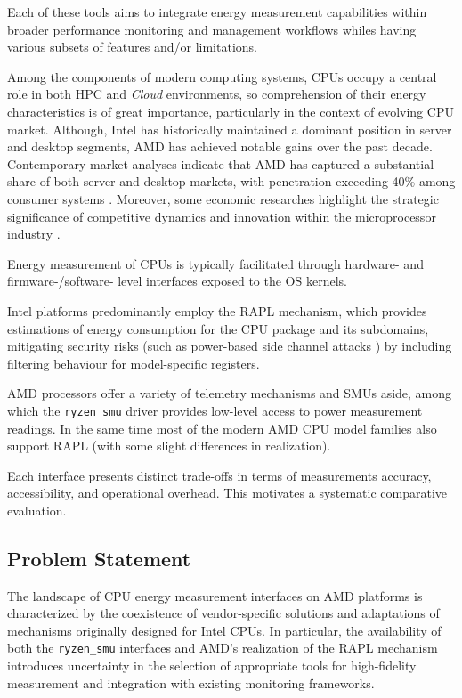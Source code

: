 Each of these tools aims to integrate energy measurement capabilities within
broader performance monitoring and management workflows whiles having various
subsets of features and/or limitations.

Among the components of modern computing systems, \gls{CPU}s occupy a central
role in both \gls{HPC} and \emph{Cloud} environments, so comprehension
of their energy characteristics is of great importance, particularly
in the context of evolving \gls{CPU} market. Although, Intel has historically
maintained a dominant position in server and desktop segments, AMD has
achieved notable gains over the past decade. Contemporary market analyses
indicate that AMD has captured a substantial share of both server and
desktop markets, with penetration exceeding 40\% among consumer systems
\parencite{NetworkWorld2025_Q1ServerShare}. Moreover, some economic researches
highlight the strategic significance of competitive dynamics
and innovation within the microprocessor industry
\parencite{GoettlerGordon2009_Competition}.

Energy measurement of \gls{CPU}s is typically facilitated through hardware- and
firmware-/software- level interfaces exposed to the \gls{OS} kernels.

Intel platforms predominantly employ the \gls{RAPL} mechanism, which provides
estimations of energy consumption for the \gls{CPU} package and its subdomains,
mitigating security risks (such as power-based side channel attacks
\parencite{PwrLeak_2023}) by including filtering behaviour for model-specific
registers.\parencite{IntelRAPL}

AMD processors offer a variety of telemetry mechanisms and \gls{SMU}s aside,
among which the \texttt{ryzen\_smu} \parencite{RyzenSMU_GitHub} driver provides
low-level access to power measurement readings. In the same time most of the
modern AMD \gls{CPU} model families also support \gls{RAPL} (with some slight
differences in realization).

Each interface presents distinct trade-offs in terms of measurements
accuracy, accessibility, and operational overhead. This motivates a
systematic comparative evaluation.

\subsection{Problem Statement}

The landscape of \gls{CPU} energy measurement interfaces on AMD platforms is
characterized by the coexistence of vendor-specific solutions and
adaptations of mechanisms originally designed for Intel \gls{CPU}s. In
particular, the availability of both the \texttt{ryzen\_smu} interfaces
and AMD's realization of the \gls{RAPL} mechanism introduces uncertainty in the
selection of appropriate tools for high-fidelity measurement and
integration with existing monitoring frameworks.

